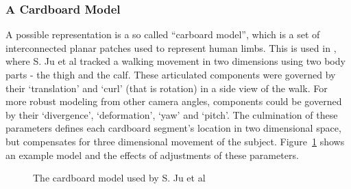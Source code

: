 \subsubsection{A Cardboard Model}

A possible representation is a so called ``carboard model'', which is a set of interconnected planar patches used to represent human limbs. This is used in \cite{cardboardpeople}, where S. Ju et al tracked a walking movement in two dimensions using two body parts - the thigh and the calf. These articulated components were governed by their `translation' and `curl' (that is rotation) in a side view of the walk. For more robust modeling from other camera angles, components could be governed by their `divergence', `deformation', `yaw' and `pitch'. The culmination of these parameters defines each cardboard segment's location in two dimensional space, but compensates for three dimensional movement of the subject. Figure~\ref{fig:cardboardmodel} shows an example model and the effects of adjustments of these parameters.

\begin{figure}[H]
    \centering
\caption{The cardboard model used by S. Ju et al\cite{cardboardpeople}}
\label{fig:cardboardmodel}
\end{figure}